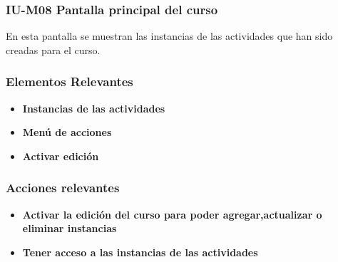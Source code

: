 \subsubsection{IU-M08 Pantalla principal del curso}

 En esta pantalla se muestran las instancias de las actividades
 que han sido creadas para el curso.


\subsubsection{Elementos Relevantes}

    \begin{itemize}
    \item {\bf Instancias de las actividades}
    \item {\bf Menú de acciones}
    \item {\bf Activar edición}
    \end{itemize}

\subsubsection{Acciones relevantes}

    \begin{itemize}
    \item {\bf Activar la edición del curso para poder agregar,actualizar o eliminar instancias}
    \item {\bf Tener acceso a las instancias de las actividades}
    \end{itemize}

\clearpage
